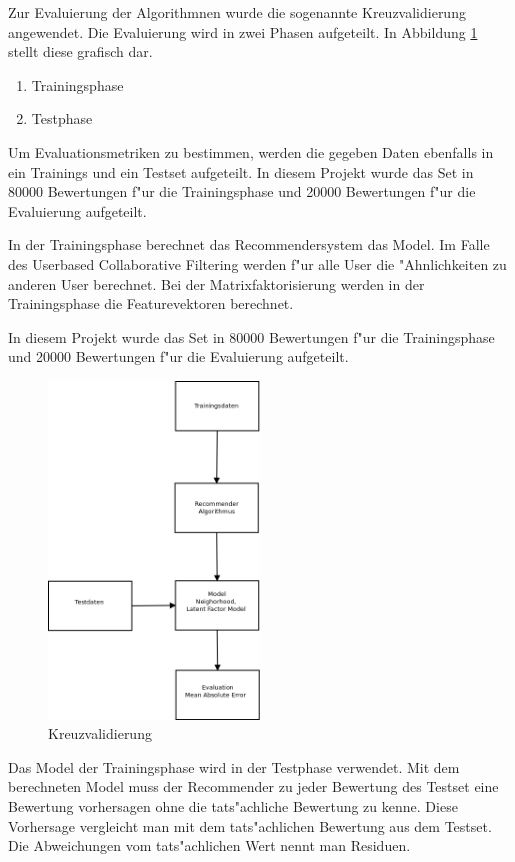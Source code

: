 \documentclass[a4paper, 12pt]{article}
\begin{document}
Zur Evaluierung der Algorithmnen wurde die sogenannte Kreuzvalidierung angewendet. Die Evaluierung wird in zwei Phasen aufgeteilt. In Abbildung \ref{fig:crossvalidation} stellt diese grafisch dar.
\begin{enumerate}
\item Trainingsphase
\item Testphase
\end{enumerate}

Um Evaluationsmetriken zu bestimmen, werden die gegeben Daten ebenfalls in ein Trainings und ein Testset aufgeteilt. In diesem Projekt wurde das Set in 80000 Bewertungen f"ur die Trainingsphase und 20000 Bewertungen f"ur die Evaluierung aufgeteilt.

In der Trainingsphase berechnet das Recommendersystem das Model. Im Falle des Userbased Collaborative Filtering werden f"ur alle User die "Ahnlichkeiten zu anderen User berechnet. Bei der Matrixfaktorisierung werden in der Trainingsphase die Featurevektoren berechnet. 

In diesem Projekt wurde das Set in 80000 Bewertungen f"ur die Trainingsphase und 20000 Bewertungen f"ur die Evaluierung aufgeteilt.

\begin{figure}
  \centering
      \includegraphics[width=0.5\textwidth]{evaluation}
  \caption{Kreuzvalidierung}
  \label{fig:crossvalidation}
\end{figure}

Das Model der Trainingsphase wird in der Testphase verwendet. Mit dem berechneten Model muss der Recommender zu jeder Bewertung des Testset eine Bewertung vorhersagen ohne die tats"achliche Bewertung zu kenne. Diese Vorhersage vergleicht man mit dem tats"achlichen Bewertung aus dem Testset. Die Abweichungen vom tats"achlichen Wert nennt man Residuen. 
\end{document}
